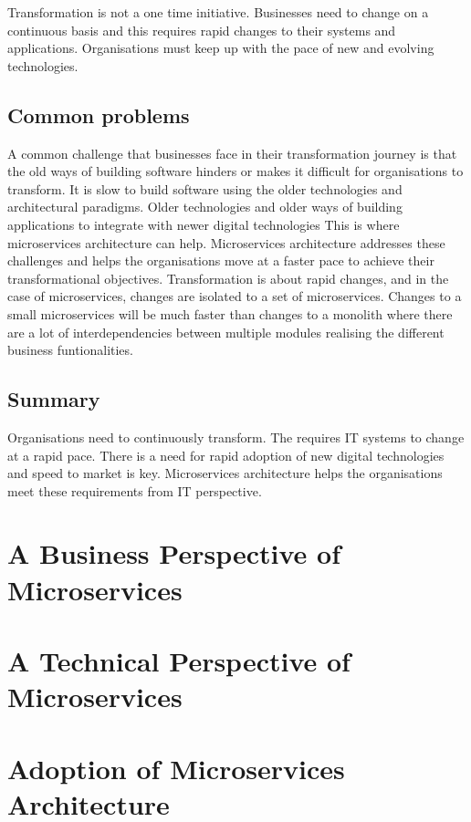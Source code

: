 \documentclass[a4paper, 11pt]{book}
\begin{document}
    Transformation is not a one time initiative.
    Businesses need to change on a continuous basis and this requires rapid changes to their systems and applications.
    Organisations must keep up with the pace of new and evolving technologies.

    \subsection{Common problems}
    A common challenge that businesses face in their transformation journey is that the old ways of building software hinders or makes it difficult for organisations to transform.
    It is slow to build software using the older technologies and architectural paradigms.
    Older technologies and older ways of building applications to integrate with newer digital technologies
    This is where microservices architecture can help.
    Microservices architecture addresses these challenges and helps the organisations move at a faster pace to achieve their transformational objectives.
    Transformation is about rapid changes, and in the case of microservices, changes are isolated to a set of microservices.
    Changes to a small microservices will be much faster than changes to a monolith where there are a lot of interdependencies between multiple modules realising the different business funtionalities.

    \subsection{Summary}
    Organisations need to continuously transform.
    The requires IT systems to change at a rapid pace.
    There is a need for rapid adoption of new digital technologies and speed to market is key.
    Microservices architecture helps the organisations meet these requirements from IT perspective.



    \section{A Business Perspective of Microservices}


    \section{A Technical Perspective of Microservices}


    \section{Adoption of Microservices Architecture}
\end{document}
